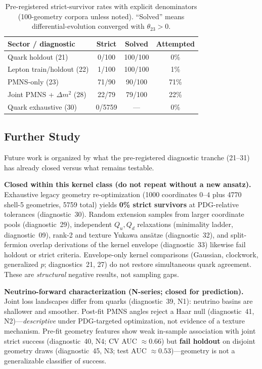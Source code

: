 \documentclass[12pt,a4paper]{article}
\begin{document}
\begin{table}[ht]
\centering
\caption{Pre-registered strict-survivor rates with explicit denominators (100-geometry corpora unless noted). ``Solved'' means differential-evolution converged with $\theta_{23} > 0$.}
\label{tab:strict_rates}
\begin{tabular}{@{}lccc@{}}
\toprule
Sector / diagnostic & Strict & Solved & Attempted \\
\midrule
Quark holdout (21) & 0/100 & 100/100 & 0\% \\
Lepton train/holdout (22) & 1/100 & 100/100 & 1\% \\
PMNS-only (23) & 71/90 & 90/100 & 71\% \\
Joint PMNS + $\Delta m^2$ (28) & 22/79 & 79/100 & 22\% \\
Quark exhaustive (30) & 0/5759 & --- & 0\% \\
\bottomrule
\end{tabular}
\end{table}

\subsection{Further Study}

Future work is organized by what the pre-registered diagnostic tranche (21--31) has already closed versus what remains testable.

\textbf{Closed within this kernel class (do not repeat without a new ansatz).}
Exhaustive legacy geometry re-optimization (1000 coordinates $0$--$4$ plus 4770 shell-5 geometries, 5759 total) yields \textbf{0\% strict survivors} at PDG-relative tolerances (diagnostic~30). Random extension samples from larger coordinate pools (diagnostic~29), independent $Q_u,Q_d$ relaxations (minimality ladder, diagnostic~09), rank-2 and texture Yukawa ans\"atze (diagnostic~32), and split-fermion overlap derivations of the kernel envelope (diagnostic~33) likewise fail holdout or strict criteria. Envelope-only kernel comparisons (Gaussian, clockwork, generalized $p$; diagnostics~21, 27) do not restore simultaneous quark agreement. These are \emph{structural} negative results, not sampling gaps.

\textbf{Neutrino-forward characterization (N-series; closed for prediction).}
Joint loss landscapes differ from quarks (diagnostic~39, N1): neutrino basins are shallower and smoother. Post-fit PMNS angles reject a Haar null (diagnostic~41, N2)---\emph{descriptive} under PDG-targeted optimization, not evidence of a texture mechanism. Pre-fit geometry features show weak in-sample association with joint strict success (diagnostic~40, N4; CV AUC $\approx 0.66$) but \textbf{fail holdout} on disjoint geometry draws (diagnostic~45, N3; test AUC $\approx 0.53$)---geometry is not a generalizable classifier of success.
\end{document}
